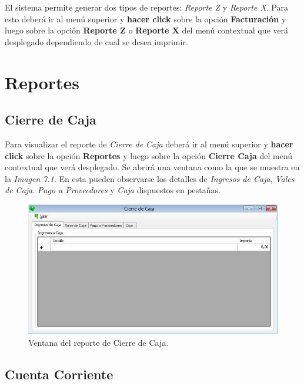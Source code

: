 \documentclass{book}
\begin{document}
	El sistema permite generar dos tipos de reportes: \textit{Reporte Z} y \textit{Reporte X}. Para esto deberá ir al menú superior y \textbf{hacer click} sobre la opción \textbf{Facturación} y luego sobre la opción \textbf{Reporte Z} o \textbf{Reporte X} del menú contextual que verá desplegado dependiendo de cual se desea imprimir.


%
%
\chapter{Reportes}


\section{Cierre de Caja}

Para visualizar el reporte de \textit{Cierre de Caja} deberá ir al menú superior y \textbf{hacer click} sobre la opción \textbf{Reportes} y luego sobre la opción \textbf{Cierre Caja} del menú contextual que verá desplegado. Se abrirá una ventana como la que se muestra en la \textit{Imagen 7.1}. En esta pueden observarse los detalles de \textit{Ingresos de Caja}, \textit{Vales de Caja}. \textit{Pago a Proveedores} y \textit{Caja} dispuestos en pestañas.
\bigskip

\begin{figure}[H]
	\centering
	\includegraphics[width=1.0\textwidth]{images/ventanas/ventana-12.jpg}
	\caption{Ventana del reporte de Cierre de Caja.}
	\medskip
\end{figure}
\bigskip


\section{Cuenta Corriente}
\end{document}
